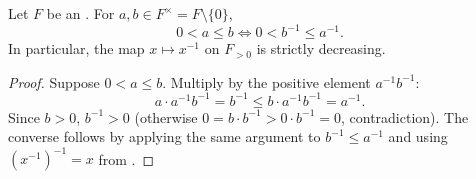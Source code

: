 \begin{proposition} \label{proposition:inverse_preserves_order_in_ordered_field}
    Let $F$ be an . For $a,b \in F^\times = F \setminus \{0\}$,
    $$0 < a \le b \iff 0 < b^{-1} \le a^{-1}.$$
    In particular, the map $x \mapsto x^{-1}$ on $F_{>0}$ is strictly decreasing.
\end{proposition}
\begin{proof}
    Suppose $0 < a \le b$. Multiply by the positive element $a^{-1}b^{-1}$:
    $$a \cdot a^{-1}b^{-1} = b^{-1} \le b \cdot a^{-1}b^{-1} = a^{-1}.$$
    Since $b > 0$, $b^{-1} > 0$ (otherwise $0 = b \cdot b^{-1} > 0 \cdot b^{-1} = 0$, contradiction). The converse follows by applying the same argument to $b^{-1} \le a^{-1}$ and using $(x^{-1})^{-1} = x$ from .
\end{proof}